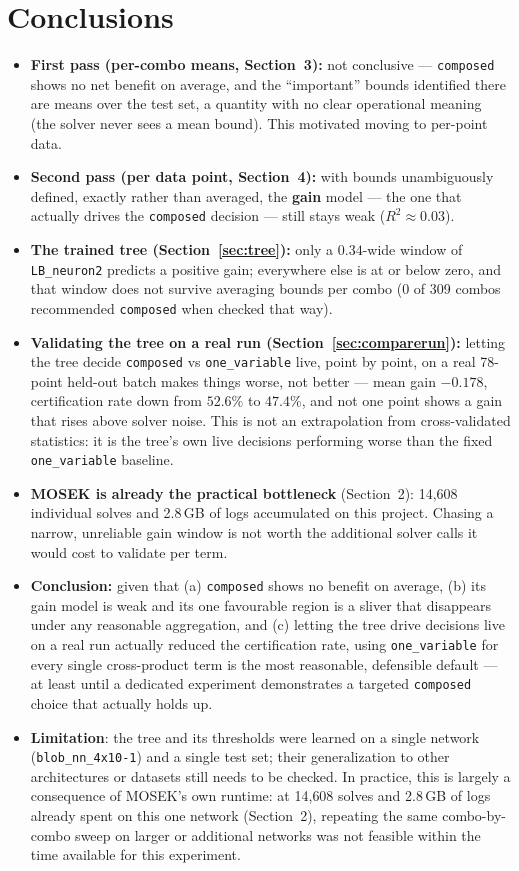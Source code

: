 \documentclass[11pt,a4paper]{article}
\begin{document}
\section{Conclusions}
\begin{itemize}
  \item \textbf{First pass (per-combo means, Section~3):} not conclusive --- \texttt{composed} shows no net benefit on average, and the ``important'' bounds identified there are means over the test set, a quantity with no clear operational meaning (the solver never sees a mean bound). This motivated moving to per-point data.
  \item \textbf{Second pass (per data point, Section~4):} with bounds unambiguously defined, exactly rather than averaged, the \textbf{gain} model --- the one that actually drives the \texttt{composed} decision --- still stays weak ($R^2\approx 0.03$).
  \item \textbf{The trained tree (Section~\ref{sec:tree}):} only a $0.34$-wide window of \texttt{LB\_neuron2} predicts a positive gain; everywhere else is at or below zero, and that window does not survive averaging bounds per combo (0 of 309 combos recommended \texttt{composed} when checked that way).
  \item \textbf{Validating the tree on a real run (Section~\ref{sec:comparerun}):} letting the tree decide \texttt{composed} vs \texttt{one\_variable} live, point by point, on a real 78-point held-out batch makes things worse, not better --- mean gain $-0.178$, certification rate down from $52.6\%$ to $47.4\%$, and not one point shows a gain that rises above solver noise. This is not an extrapolation from cross-validated statistics: it is the tree's own live decisions performing worse than the fixed \texttt{one\_variable} baseline.
  \item \textbf{MOSEK is already the practical bottleneck} (Section~2): 14{,}608 individual solves and 2.8\,GB of logs accumulated on this project. Chasing a narrow, unreliable gain window is not worth the additional solver calls it would cost to validate per term.
  \item \textbf{Conclusion:} given that (a) \texttt{composed} shows no benefit on average, (b) its gain model is weak and its one favourable region is a sliver that disappears under any reasonable aggregation, and (c) letting the tree drive decisions live on a real run actually reduced the certification rate, using \texttt{one\_variable} for every single cross-product term is the most reasonable, defensible default --- at least until a dedicated experiment demonstrates a targeted \texttt{composed} choice that actually holds up.
  \item \textbf{Limitation}: the tree and its thresholds were learned on a single network (\texttt{blob\_nn\_4x10-1}) and a single test set; their generalization to other architectures or datasets still needs to be checked. In practice, this is largely a consequence of MOSEK's own runtime: at 14{,}608 solves and 2.8\,GB of logs already spent on this one network (Section~2), repeating the same combo-by-combo sweep on larger or additional networks was not feasible within the time available for this experiment.
\end{itemize}
\end{document}
